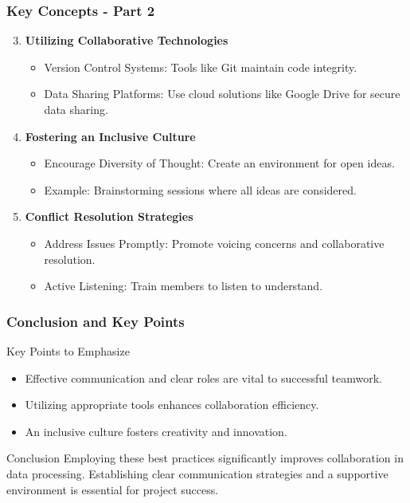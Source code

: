 \documentclass[aspectratio=169]{beamer}
\begin{document}
\begin{frame}[fragile]
    \frametitle{Key Concepts - Part 2}
    \begin{enumerate}
        \setcounter{enumi}{2}
        \item \textbf{Utilizing Collaborative Technologies}
            \begin{itemize}
                \item Version Control Systems: Tools like Git maintain code integrity.
                \item Data Sharing Platforms: Use cloud solutions like Google Drive for secure data sharing.
            \end{itemize}
        
        \item \textbf{Fostering an Inclusive Culture}
            \begin{itemize}
                \item Encourage Diversity of Thought: Create an environment for open ideas.
                \item Example: Brainstorming sessions where all ideas are considered.
            \end{itemize}
        
        \item \textbf{Conflict Resolution Strategies}
            \begin{itemize}
                \item Address Issues Promptly: Promote voicing concerns and collaborative resolution.
                \item Active Listening: Train members to listen to understand.
            \end{itemize}
    \end{enumerate}
\end{frame}

\begin{frame}[fragile]
    \frametitle{Conclusion and Key Points}
    \begin{block}{Key Points to Emphasize}
        \begin{itemize}
            \item Effective communication and clear roles are vital to successful teamwork.
            \item Utilizing appropriate tools enhances collaboration efficiency.
            \item An inclusive culture fosters creativity and innovation.
        \end{itemize}
    \end{block}
    
    \begin{block}{Conclusion}
        Employing these best practices significantly improves collaboration in data processing. Establishing clear communication strategies and a supportive environment is essential for project success.
    \end{block}
\end{frame}
\end{document}
